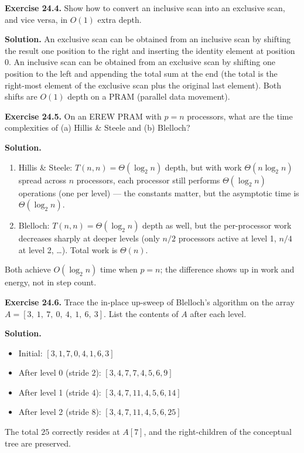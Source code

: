 \begin{ppexercises}
\textbf{Exercise 24.4.} Show how to convert an inclusive scan into an
exclusive scan, and vice versa, in $O(1)$ extra depth.

\medskip
\textbf{Solution.} An exclusive scan can be obtained from an inclusive
scan by shifting the result one position to the right and inserting the
identity element at position 0. An inclusive scan can be obtained from
an exclusive scan by shifting one position to the left and appending
the total sum at the end (the total is the right-most element of the
exclusive scan plus the original last element). Both shifts are
$O(1)$ depth on a PRAM (parallel data movement).
\end{ppexercises}

\begin{ppexercises}
\textbf{Exercise 24.5.} On an EREW PRAM with $p = n$ processors,
what are the time complexities of (a) Hillis \& Steele and
(b) Blelloch?

\medskip
\textbf{Solution.}
\begin{enumerate}[label=(\alph*),leftmargin=*]
  \item Hillis \& Steele: $T(n, n) = \Theta(\log_2 n)$ depth, but
        with work $\Theta(n \log_2 n)$ spread across $n$ processors,
        each processor still performs $\Theta(\log_2 n)$ operations
        (one per level) --- the constants matter, but the asymptotic
        time is $\Theta(\log_2 n)$.
  \item Blelloch: $T(n, n) = \Theta(\log_2 n)$ depth as well, but the
        per-processor work decreases sharply at deeper levels (only
        $n/2$ processors active at level 1, $n/4$ at level 2,
        \ldots). Total work is $\Theta(n)$.
\end{enumerate}
Both achieve $O(\log_2 n)$ time when $p = n$; the difference shows up
in work and energy, not in step count.
\end{ppexercises}

\begin{ppexercises}
\textbf{Exercise 24.6.} Trace the in-place up-sweep of Blelloch's
algorithm on the array $A = [3,\ 1,\ 7,\ 0,\ 4,\ 1,\ 6,\ 3]$. List
the contents of $A$ after each level.

\medskip
\textbf{Solution.}
\begin{itemize}[leftmargin=*]
  \item Initial: $[3, 1, 7, 0, 4, 1, 6, 3]$
  \item After level 0 (stride $2$): $[3, 4, 7, 7, 4, 5, 6, 9]$
  \item After level 1 (stride $4$): $[3, 4, 7, 11, 4, 5, 6, 14]$
  \item After level 2 (stride $8$): $[3, 4, 7, 11, 4, 5, 6, 25]$
\end{itemize}
The total $25$ correctly resides at $A[7]$, and the right-children of
the conceptual tree are preserved.
\end{ppexercises}

